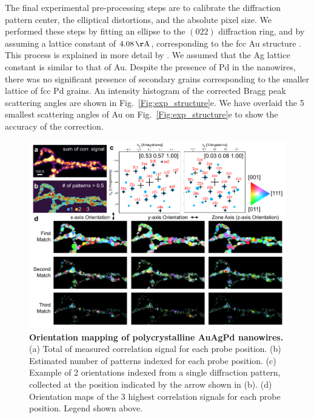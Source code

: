 \documentclass[%
 superscriptaddress,
 aip,
 amsmath,amssymb,
reprint,%
 author-year,%
longbibliography
]{revtex4-2}
\begin{document}
The final experimental pre-processing steps are to calibrate the diffraction pattern center, the elliptical distortions, and the absolute pixel size. We performed these steps by fitting an ellipse to the $(022)$ diffraction ring, and by assuming a lattice constant of $4.08 \, \rm{\AA}$, corresponding to the fcc Au structure \citep{maeland1964lattice}. This process is explained in more detail by \cite{savitzky2021py4dstem}. We assumed that the Ag lattice constant is similar to that of Au. Despite the presence of Pd in the nanowires, there was no significant presence of secondary grains corresponding to the smaller lattice of fcc Pd grains. An intensity histogram of the corrected Bragg peak scattering angles are shown in Fig.~\ref{Fig:exp_structure}e. We have overlaid the 5 smallest scattering angles of Au on Fig.~\ref{Fig:exp_structure}e to show the accuracy of the correction.


\begin{figure}[htbp]
    \centering
    \includegraphics[width=6.4in]{figure_AuAg_orientation_v03.pdf}
    \caption{{\bf Orientation mapping of polycrystalline AuAgPd nanowires.} (a) Total of measured correlation signal for each probe position. (b) Estimated number of patterns indexed for each probe position. (c) Example of 2 orientations indexed from a single diffraction pattern, collected at the position indicated by the arrow shown in (b). (d) Orientation maps of the 3 highest correlation signals for each probe position. Legend shown above.}
    \label{Fig:ACOM_AuAgPd}
\end{figure}
\end{document}
